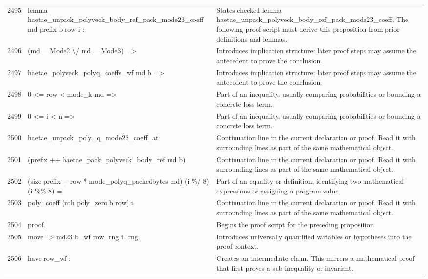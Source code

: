 \documentclass[10pt]{article}
\begin{document}
\begin{longtable}{r L{0.53\textwidth} L{0.37\textwidth}}
2495 & {\ttfamily\scriptsize lemma haetae\_unpack\_polyveck\_body\_ref\_pack\_mode23\_coeff md prefix b row i :} & States checked lemma haetae\_unpack\_polyveck\_body\_ref\_pack\_mode23\_coeff.  The following proof script must derive this proposition from prior definitions and lemmas. \\
2496 & {\ttfamily\scriptsize   (md = Mode2 \textbackslash{}/ md = Mode3) =>} & Introduces implication structure: later proof steps may assume the antecedent to prove the conclusion. \\
2497 & {\ttfamily\scriptsize   haetae\_polyveck\_polyq\_coeffs\_wf md b =>} & Introduces implication structure: later proof steps may assume the antecedent to prove the conclusion. \\
2498 & {\ttfamily\scriptsize   0 <= row < mode\_k md =>} & Part of an inequality, usually comparing probabilities or bounding a concrete loss term. \\
2499 & {\ttfamily\scriptsize   0 <= i < n =>} & Part of an inequality, usually comparing probabilities or bounding a concrete loss term. \\
2500 & {\ttfamily\scriptsize   haetae\_unpack\_poly\_q\_mode23\_coeff\_at} & Continuation line in the current declaration or proof.  Read it with surrounding lines as part of the same mathematical object. \\
2501 & {\ttfamily\scriptsize     (prefix ++ haetae\_pack\_polyveck\_body\_ref md b)} & Continuation line in the current declaration or proof.  Read it with surrounding lines as part of the same mathematical object. \\
2502 & {\ttfamily\scriptsize     (size prefix + row * mode\_polyq\_packedbytes md) (i \%/ 8) (i \%\% 8) =} & Part of an equality or definition, identifying two mathematical expressions or assigning a program value. \\
2503 & {\ttfamily\scriptsize   poly\_coeff (nth poly\_zero b row) i.} & Continuation line in the current declaration or proof.  Read it with surrounding lines as part of the same mathematical object. \\
2504 & {\ttfamily\scriptsize proof.} & Begins the proof script for the preceding proposition. \\
2505 & {\ttfamily\scriptsize move=> md23 b\_wf row\_rng i\_rng.} & Introduces universally quantified variables or hypotheses into the proof context. \\
2506 & {\ttfamily\scriptsize have row\_wf :} & Creates an intermediate claim.  This mirrors a mathematical proof that first proves a sub-inequality or invariant. \\

\end{longtable}
\end{document}

